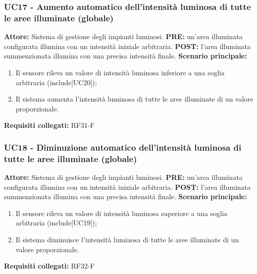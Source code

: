 \documentclass[a4paper, 12pt]{article}
\begin{document}
\subsubsection{UC17 - Aumento automatico dell'intensità luminosa di tutte le aree illuminate (globale)}
\textbf{Attore:} Sistema di gestione degli impianti luminosi.\newline
\textbf{PRE:} un'area illuminata configurata illumina con un intensità iniziale arbitraria.\newline
\textbf{POST:} l'area illuminata summenzionata illumina con una precisa intensità finale.\newline
\textbf{Scenario principale:}
\begin{enumerate}
    \item Il sensore rileva un valore di intensità luminosa inferiore a una soglia arbitraria (include[UC20]);
    \item Il sistema aumenta l’intensità luminosa di tutte le aree illuminate di un valore proporzionale.
\end{enumerate}
\textbf{Requisiti collegati:} RF31-F\newline

\subsubsection{UC18 - Diminuzione automatico dell'intensità luminosa di tutte le aree illuminate (globale)}
\textbf{Attore:} Sistema di gestione degli impianti luminosi.\newline
\textbf{PRE:} un'area illuminata configurata illumina con un intensità iniziale arbitraria.\newline
\textbf{POST:} l'area illuminata summenzionata illumina con una precisa intensità finale.\newline
\textbf{Scenario principale:}
\begin{enumerate}
    \item Il sensore rileva un valore di intensità luminosa superiore a una soglia arbitraria (include[UC19]);
    \item Il sistema diminuisce l’intensità luminosa di tutte le aree illuminate di un valore proporzionale.
\end{enumerate}
\textbf{Requisiti collegati:} RF32-F\newline
\end{document}
